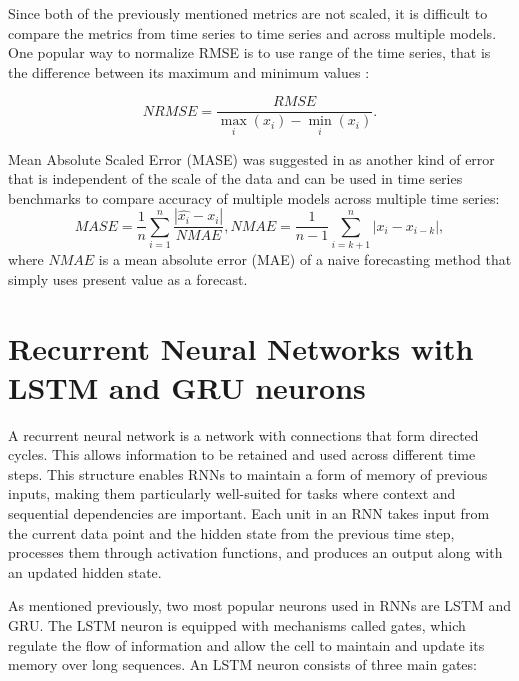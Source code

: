 \documentclass[sn-apa]{sn-jnl}%
\begin{document}
Since both of the previously mentioned metrics are not scaled, it is difficult to compare the metrics from time series to time series and across multiple models. One popular way to normalize RMSE is to use range of the time series, that is the difference between its maximum and minimum values \citep{shcherbakov2013survey}:

\begin{equation}
NRMSE = \frac{RMSE}{\max\limits_{i}(x_i) - \min\limits_{i}(x_i)}. \label{eq4}
\end{equation}

Mean Absolute Scaled Error (MASE) was suggested in \citep{hyndman2006another} as another kind of error that is independent of the scale of the data and can be used in time series benchmarks to compare accuracy of multiple models across multiple time series:
\begin{equation}
MASE = \frac{1}{n}\sum_{i=1}^{n}{\frac{|\hat{x_i} - x_i|}{NMAE}},
NMAE = \frac{1}{n-1}\sum_{i=k+1}^{n}{|x_i - x_{i-k}|},\label{eq5}
\end{equation}
where $NMAE$ is a mean absolute error (MAE) of a naive forecasting method that simply uses present value as a forecast.
 
\section{Recurrent Neural Networks with LSTM and GRU neurons }\label{sec4}
A recurrent neural network is a network with connections that form directed cycles. This allows information to be retained and used across different time steps. This structure enables RNNs to maintain a form of memory of previous inputs, making them particularly well-suited for tasks where context and sequential dependencies are important. Each unit in an RNN takes input from the current data point and the hidden state from the previous time step, processes them through activation functions, and produces an output along with an updated hidden state.

As mentioned previously, two most popular neurons used in RNNs are LSTM and GRU. The LSTM neuron is equipped with mechanisms called gates, which regulate the flow of information and allow the cell to maintain and update its memory over long sequences. An LSTM neuron consists of three main gates:
\end{document}
